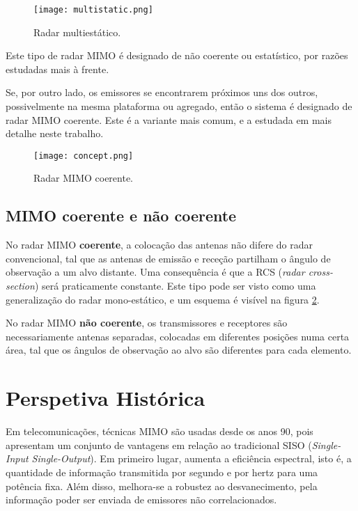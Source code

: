 \documentclass[purist,portuguese]{ist-report}
\begin{document}
\begin{figure}[h]
  \centering
  \texttt{[image: multistatic.png]}
  \caption{Radar multiestático.}
  \label{fig:multi}
\end{figure}

Este tipo de radar MIMO é designado de não coerente ou estatístico, por razões estudadas mais à frente.

Se, por outro lado, os emissores se encontrarem próximos uns dos outros, possivelmente na mesma plataforma ou agregado, então o sistema é designado de radar MIMO coerente.
Este é a variante mais comum, e a estudada em mais detalhe neste trabalho.

\begin{figure}[h]
  \centering
  \texttt{[image: concept.png]}
  \caption{Radar MIMO coerente.}
  \label{fig:concept}
\end{figure}

\subsection{MIMO coerente e não coerente}

No radar MIMO \textbf{coerente}, a colocação das antenas não difere do radar convencional, tal que as antenas de emissão e receção partilham o ângulo de observação a um alvo distante.
Uma consequência é que a RCS (\textit{radar cross-section}) será praticamente constante.
Este tipo pode ser visto como uma generalização do radar mono-estático, e um esquema é visível na figura \ref{fig:concept}.

No radar MIMO \textbf{não coerente}, os transmissores e receptores são necessariamente antenas separadas, colocadas em diferentes posições numa certa área, tal que os ângulos de observação ao alvo são diferentes para cada elemento.

\section{Perspetiva Histórica}

Em telecomunicações, técnicas MIMO são usadas desde os anos 90, pois apresentam um conjunto de vantagens em relação ao tradicional SISO (\textit{Single-Input Single-Output}).
Em primeiro lugar, aumenta a eficiência espectral, isto é, a quantidade de informação transmitida por segundo e por hertz para uma potência fixa. 
Além disso, melhora-se a robustez ao desvanecimento, pela informação poder ser enviada de emissores não correlacionados.
\end{document}
